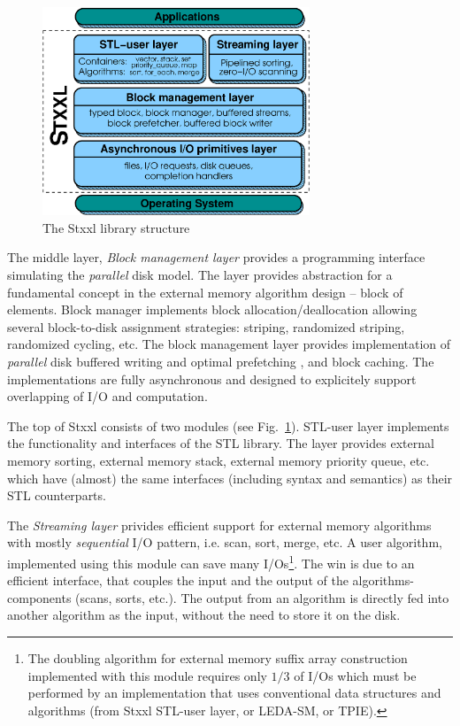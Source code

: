 \documentclass[twoside]{book}
\newcommand{\stxxl}{{\sc Stxxl} }
\begin{document}
\begin{figure}[hb]
\begin{center}
\includegraphics[width=8cm]{logo1.eps}
\end{center}
\vspace*{-0.3cm}
\caption{\label{stxxlstructure}The \stxxl library structure}
\end{figure}

The middle layer, \emph{Block management layer} provides a programming
interface simulating the \emph{parallel} disk model. The layer provides
abstraction for a fundamental concept in the external memory algorithm
design -- block of elements. Block manager implements
block allocation/deallocation allowing several block-to-disk
assignment strategies: striping, randomized striping, randomized
cycling, etc. The block management layer provides implementation
of \emph{parallel} disk buffered writing and optimal prefetching
\cite{HutSanVit01b}, and block caching. The implementations are fully
asynchronous and designed to explicitely support overlapping of I/O
and computation. 

The top of \stxxl consists of two modules (see Fig.~\ref{stxxlstructure}). 
STL-user layer implements the functionality and interfaces of the STL
library. The layer provides external memory sorting, external memory
stack, external memory priority queue, etc. which have
(almost) the same interfaces (including syntax and semantics) as their
STL counterparts.

The \emph{Streaming layer} privides efficient support for external
memory algorithms with mostly \emph{sequential} I/O pattern, i.e. scan, sort,
merge, etc. A user algorithm, implemented using this module can save
many I/Os\footnote{The doubling algorithm for external memory suffix
array construction implemented with this module requires only $1/3$ of
I/Os which must be performed by an implementation that uses conventional
data structures and algorithms (from \stxxl STL-user layer, or LEDA-SM,
or TPIE).}. The win is due to an efficient interface, that couples the
input   
and the output of the algorithms-components (scans, sorts,
etc.). The 
output from an algorithm is directly fed into another algorithm as the
input, without the need to store it on the disk.
\end{document}
